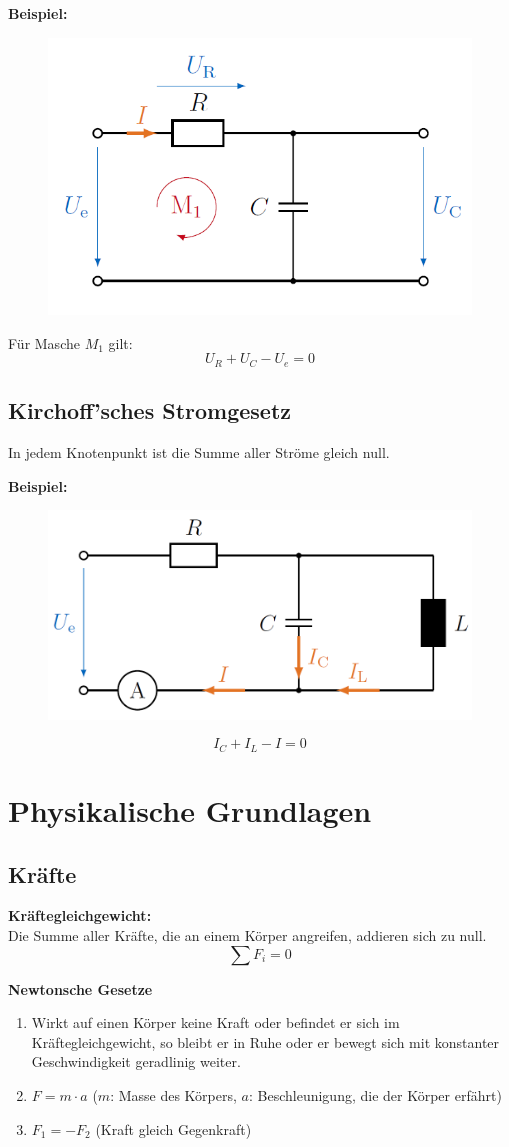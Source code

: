 \documentclass[10pt,a4paper]{article}
\newcommand{\tab}[1][1]{\hspace*{#1cm}}
\begin{document}
\textbf{Beispiel:}
\begin{figure}[H]
	\includegraphics[width=0.5\columnwidth]{imgs/kvl.png}
\end{figure}
Für Masche $M_1$ gilt:
$$
U_R + U_C - U_e = 0
$$

\subsection{Kirchoff'sches Stromgesetz}
In jedem Knotenpunkt ist die Summe aller Ströme gleich null.

\textbf{Beispiel:}
\begin{figure}[H]
	\includegraphics[width=0.5\columnwidth]{imgs/kcl.png}
\end{figure}
$$
	I_C + I_L - I = 0
$$

\section{Physikalische Grundlagen}
\subsection{Kräfte}
\textbf{Kräftegleichgewicht:} \\
Die Summe aller Kräfte, die an einem Körper angreifen, addieren sich zu null.
$$
	\sum F_i = 0
$$

\textbf{Newtonsche Gesetze}
\begin{enumerate}
	\item Wirkt auf einen Körper keine Kraft oder befindet er sich im Kräftegleichgewicht, so bleibt er in Ruhe oder er bewegt sich mit konstanter Geschwindigkeit geradlinig weiter.
	\item $F = m ⋅ a$ \tab[2] ($m$: Masse des Körpers, $a$: Beschleunigung, die der Körper erfährt)
	\item $F_1 = -F_2$ \tab[2] (Kraft gleich Gegenkraft)
\end{enumerate}
\end{document}
